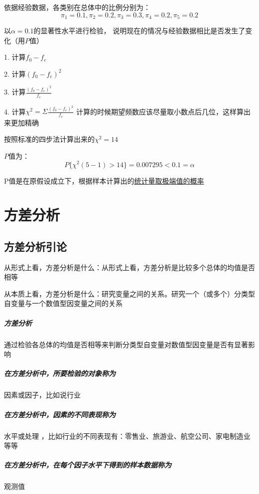 \documentclass[UTF8,10pt]{book}
\begin{document}
{依据经验数据，各类别在总体中的比例分别为： 
$$ \pi_1 = 0.1 , \pi_2 = 0.2 , \pi_3 = 0.3 , \pi_4 = 0.2 , \pi_5 = 0.2 $$ 

以$\alpha=0.1$的显著性水平进行检验，
说明现在的情况与经验数据相比是否发生了变化（用$P$值）	

1. 计算$f_0 -f_e$ 

2. 计算$(f_0 -f_e)^2$ 

3. 计算$\frac{(f_0 -f_e)^2}{f_e}$ 

4. 计算$\chi^2 = \Sigma \frac{(f_0-f_e)^2}{f_e} $ 
计算的时候期望频数应该尽量取小数点后几位，这样算出来更加精确 

按照标准的四步法计算出来的$\chi^2 = 14$ 

$P$值为： 
$$ P\{\chi^2(5-1)>14\}=0.007295<0.1=\alpha $$	

P值是在原假设成立下，根据样本计算出的\underline{统计量取极端值的概率}
}


\clearpage
\chapter{方差分析}

\section{方差分析引论}
从形式上看，方差分析是什么：{\kaishu 从形式上看，方差分析是比较多个总体的均值是否相等}

从本质上看，方差分析是什么：{\kaishu 研究变量之间的关系。研究一个（或多个）分类型自变量与一个数值型因变量之间的关系}

\paragraph{方差分析}	通过检验各总体的均值是否相等来判断分类型自变量对数值型因变量是否有显著影响
\paragraph{在方差分析中，所要检验的对象称为}	因素或因子，比如说行业
\paragraph{在方差分析中，因素的不同表现称为}	水平或处理 ，比如行业的不同表现有：零售业、旅游业、航空公司、家电制造业等等
\paragraph{在方差分析中，在每个因子水平下得到的样本数据称为}	观测值
\end{document}
